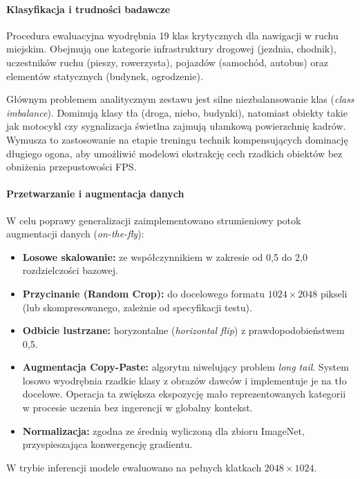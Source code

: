 \paragraph{Klasyfikacja i trudności badawcze}
Procedura ewaluacyjna wyodrębnia 19 klas krytycznych dla nawigacji w ruchu miejskim. Obejmują one kategorie infrastruktury drogowej (jezdnia, chodnik), uczestników ruchu (pieszy, rowerzysta), pojazdów (samochód, autobus) oraz elementów statycznych (budynek, ogrodzenie). 

Głównym problemem analitycznym zestawu jest silne niezbalansowanie klas (\textit{class imbalance}). Dominują klasy tła (droga, niebo, budynki), natomiast obiekty takie jak motocykl czy sygnalizacja świetlna zajmują ułamkową powierzchnię kadrów. Wymusza to zastosowanie na etapie treningu technik kompensujących dominację długiego ogona, aby umożliwić modelowi ekstrakcję cech rzadkich obiektów bez obniżenia przepustowości FPS.

\paragraph{Przetwarzanie i augmentacja danych}
W celu poprawy generalizacji zaimplementowano strumieniowy potok augmentacji danych (\textit{on-the-fly}):
\begin{itemize}
    \item \textbf{Losowe skalowanie:} ze współczynnikiem w zakresie od 0,5 do 2,0 rozdzielczości bazowej.
    \item \textbf{Przycinanie (Random Crop):} do docelowego formatu $1024 \times 2048$ pikseli (lub skompresowanego, zależnie od specyfikacji testu).
    \item \textbf{Odbicie lustrzane:} horyzontalne (\textit{horizontal flip}) z prawdopodobieństwem 0,5.
    \item \textbf{Augmentacja Copy-Paste:} algorytm niwelujący problem \textit{long tail}. System losowo wyodrębnia rzadkie klasy z obrazów dawców i implementuje je na tło docelowe. Operacja ta zwiększa ekspozycję mało reprezentowanych kategorii w procesie uczenia bez ingerencji w globalny kontekst.
    \item \textbf{Normalizacja:} zgodna ze średnią wyliczoną dla zbioru ImageNet, przyspieszająca konwergencję gradientu.
\end{itemize}
W trybie inferencji modele ewaluowano na pełnych klatkach $2048 \times 1024$.

